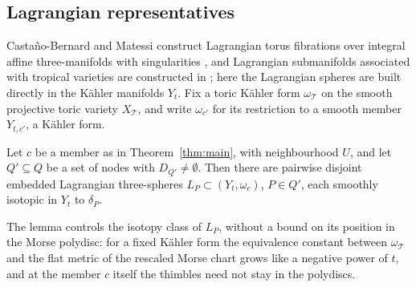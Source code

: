 \subsection{Lagrangian representatives}\label{ssec:lagrangian}

Casta\~no-Bernard and Matessi construct Lagrangian torus fibrations over integral affine three-manifolds with
singularities \cite{CBM09}, and Lagrangian submanifolds associated with tropical varieties are constructed in
\cite{Mik19,Mat21a,Mat21b}; here the Lagrangian spheres are built directly in the K\"ahler manifolds $Y_t$. Fix a toric
K\"ahler form $\omega_{\mathcal T}$ on the smooth projective toric variety $X_{\mathcal T}$, and write $\omega_{c'}$ for its
restriction to a smooth member $Y_{t,c'}$, a K\"ahler form.

\begin{lemma}\label{lem:L}
Let $c$ be a member as in Theorem~\ref{thm:main}, with neighbourhood $U$, and let $Q'\subseteq Q$ be a set of nodes with
$D_{Q'}\neq\emptyset$. Then there are pairwise disjoint embedded Lagrangian three-spheres $L_P\subset(Y_t,\omega_c)$,
$P\in Q'$, each smoothly isotopic in $Y_t$ to $\delta_P$.
\end{lemma}

The lemma controls the isotopy class of $L_P$, without a bound on its position in the Morse polydisc: for a fixed K\"ahler form the equivalence constant between
$\omega_{\mathcal T}$ and the flat metric of the rescaled Morse chart grows like a negative power of $t$, and at the member
$c$ itself the thimbles need not stay in the polydiscs.

